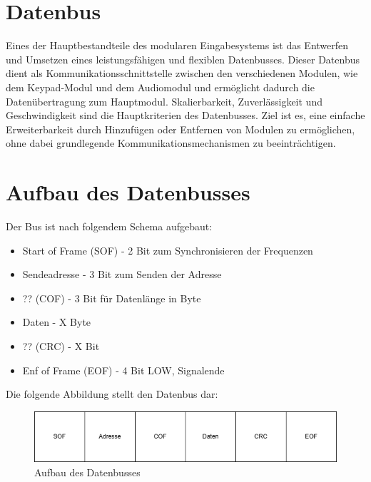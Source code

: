 \section{Datenbus}
Eines der Hauptbestandteile des modularen Eingabesystems ist das Entwerfen und Umsetzen eines leistungsfähigen und flexiblen Datenbusses. Dieser Datenbus dient als Kommunikationsschnittstelle zwischen den verschiedenen Modulen, wie dem Keypad-Modul und dem Audiomodul und ermöglicht dadurch die Datenübertragung zum Hauptmodul. Skalierbarkeit, Zuverlässigkeit und Geschwindigkeit sind die Hauptkriterien des Datenbusses. Ziel ist es, eine einfache Erweiterbarkeit durch Hinzufügen oder Entfernen von Modulen zu ermöglichen, ohne dabei grundlegende Kommunikationsmechanismen zu beeinträchtigen.

\section{Aufbau des Datenbusses}
Der Bus ist nach folgendem Schema aufgebaut:
\begin{itemize}
    \item Start of Frame (SOF) - 2 Bit zum Synchronisieren der Frequenzen
    \item Sendeadresse -  3 Bit zum Senden der Adresse
    \item ?? (COF) - 3 Bit für Datenlänge in Byte
    \item Daten - X Byte
    \item ?? (CRC) - X Bit
    \item Enf of Frame (EOF) - 4 Bit LOW, Signalende
\end{itemize}

Die folgende Abbildung stellt den Datenbus dar:
\begin{figure}[H]
    \centering    
    \includegraphics[width=1\textwidth]{Bilder/datenbus.png}
    \caption{Aufbau des Datenbusses}
    \label{Datenbus}
\end{figure}
